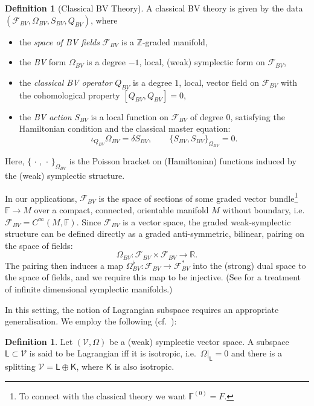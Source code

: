 \documentclass[reqno]{amsart}
\theoremstyle{definition}
\newtheorem{defn}[thm]{Definition}
\theoremstyle{remark}
\newcommand{\V}{\mathcal{V}}
\newcommand{\R}{\mathbb{R}}
\newcommand{\Z}{\mathbb{Z}}
\newcommand{\C}{C^\infty}
\newcommand{\FF}{\mathbb{F}}
\newcommand{\F}{\mathcal{F}}
\newcommand{\sfK}{\mathsf{K}}
\newcommand{\sfL}{\mathsf{L}}
\begin{document}
\begin{defn}[Classical BV Theory]
\label{def:BV_classical}
A classical BV theory is given by the data $(\F_{BV}, \Omega_{BV}, S_{BV}, Q_{BV})$, where
\begin{itemize}
    \item the \emph{space of BV fields} $\F_{BV}$ is a $\Z$-graded manifold,
    \item the \emph{BV} form $\Omega_{BV}$ is a degree $-1$, local, (weak) symplectic form on $\F_{BV}$,
    \item the \emph{classical BV operator} $Q_{BV}$ is a degree $1$, local, vector field on $\F_{BV}$ with the cohomological property $[Q_{BV},Q_{BV}]=0$, 
    \item the \emph{BV action} $S_{BV}$ is a local function on $\F_{BV}$ of degree $0$, satisfying the Hamiltonian condition and the classical master equation: 
    \[
    \iota_{Q_{BV}}\Omega_{BV} = \delta S_{BV}, \qquad \{S_{BV},S_{BV}\}_{\Omega_{BV}} = 0.
    \]
\end{itemize}
Here, $\{\,\cdot\,,\,\cdot\,\}_{\Omega_{BV}}$ is the Poisson bracket on (Hamiltonian) functions induced by the (weak) symplectic structure.

\end{defn}




In our applications, $\F_{BV}$ is the space of sections of some graded vector bundle\footnote{To connect with the classical theory we want $\FF^{(0)}=F$.} $\FF\to M$ over a compact, connected, orientable manifold $M$ without boundary, i.e.\ $\F_{BV} = \C(M,\FF)$.
Since $\F_{BV}$ is a vector space, the graded weak-symplectic structure can be defined directly as a graded anti-symmetric, bilinear, pairing on the space of fields:
$$\Omega_{BV}: \F_{BV}\times\F_{BV} \to \R.$$
The pairing then induces a map $\Omega_{BV}^\flat: \F_{BV} \to \F_{BV}^*$ into the (strong) dual space to the space of fields, and we require this map to be injective. (See \cite[Section 48]{kriegl_michor} for a treatment of infinite dimensional symplectic manifolds.)


In this setting, the notion of Lagrangian subspace requires an appropriate generalisation. We employ the following (cf.\ \cite{weinstein,cattaneo-contreras-split}):

\begin{defn}
\label{def:lagrangian_subspace}
Let $(\V,\Omega)$ be a (weak) symplectic vector space. A subspace $\sfL\subset \V$ is said to be Lagrangian iff it is isotropic, i.e.\ $\Omega\vert_{\sfL}=0$ and there is a splitting $\V = \sfL\oplus\sfK$, where $\sfK$ is also isotropic.
\end{defn}
\end{document}
